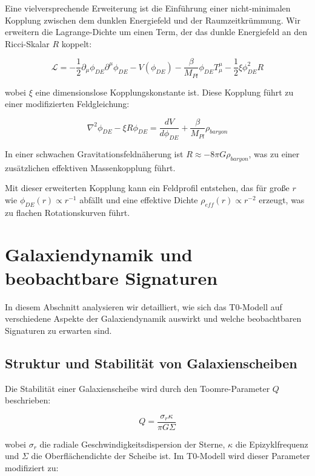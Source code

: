 \documentclass[a4paper,12pt]{article}
\begin{document}
	Eine vielversprechende Erweiterung ist die Einführung einer nicht-minimalen Kopplung zwischen dem dunklen Energiefeld und der Raumzeitkrümmung. Wir erweitern die Lagrange-Dichte um einen Term, der das dunkle Energiefeld an den Ricci-Skalar $R$ koppelt:
	
	\begin{equation}
		\mathcal{L} = -\frac{1}{2}\partial_\mu \phi_{DE} \partial^\mu \phi_{DE} - V(\phi_{DE}) - \frac{\beta}{M_{Pl}}\phi_{DE}T^{\mu}_{\mu} - \frac{1}{2}\xi \phi_{DE}^2 R
	\end{equation}
	
	wobei $\xi$ eine dimensionslose Kopplungskonstante ist. Diese Kopplung führt zu einer modifizierten Feldgleichung:
	
	\begin{equation}
		\nabla^2 \phi_{DE} - \xi R \phi_{DE} = \frac{dV}{d\phi_{DE}} + \frac{\beta}{M_{Pl}}\rho_{baryon}
	\end{equation}
	
	In einer schwachen Gravitationsfeldnäherung ist $R \approx -8\pi G \rho_{baryon}$, was zu einer zusätzlichen effektiven Massenkopplung führt.
	
	Mit dieser erweiterten Kopplung kann ein Feldprofil entstehen, das für große $r$ wie $\phi_{DE}(r) \propto r^{-1}$ abfällt und eine effektive Dichte $\rho_{eff}(r) \propto r^{-2}$ erzeugt, was zu flachen Rotationskurven führt.
	
	\section{Galaxiendynamik und beobachtbare Signaturen}
	
	In diesem Abschnitt analysieren wir detailliert, wie sich das T0-Modell auf verschiedene Aspekte der Galaxiendynamik auswirkt und welche beobachtbaren Signaturen zu erwarten sind.
	
	\subsection{Struktur und Stabilität von Galaxienscheiben}
	
	Die Stabilität einer Galaxienscheibe wird durch den Toomre-Parameter $Q$ beschrieben:
	
	\begin{equation}
		Q = \frac{\sigma_r \kappa}{\pi G \Sigma}
	\end{equation}
	
	wobei $\sigma_r$ die radiale Geschwindigkeitsdispersion der Sterne, $\kappa$ die Epizyklfrequenz und $\Sigma$ die Oberflächendichte der Scheibe ist. Im T0-Modell wird dieser Parameter modifiziert zu:
	
\end{document}
